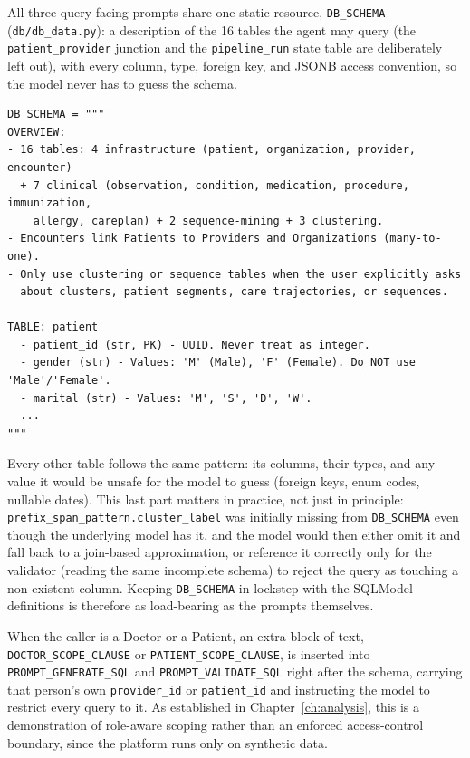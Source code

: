 All three query-facing prompts share one static resource, \texttt{DB\_SCHEMA} (\texttt{db/db\_data.py}): a description of the 16 tables the agent may query (the \texttt{patient\_provider} junction and the \texttt{pipeline\_run} state table are deliberately left out), with every column, type, foreign key, and JSONB access convention, so the model never has to guess the schema.

\vspace{0.25cm}

\begin{lstlisting}[style=pythonstyle]
DB_SCHEMA = """
OVERVIEW:
- 16 tables: 4 infrastructure (patient, organization, provider, encounter)
  + 7 clinical (observation, condition, medication, procedure, immunization,
    allergy, careplan) + 2 sequence-mining + 3 clustering.
- Encounters link Patients to Providers and Organizations (many-to-one).
- Only use clustering or sequence tables when the user explicitly asks
  about clusters, patient segments, care trajectories, or sequences.

TABLE: patient
  - patient_id (str, PK) - UUID. Never treat as integer.
  - gender (str) - Values: 'M' (Male), 'F' (Female). Do NOT use 'Male'/'Female'.
  - marital (str) - Values: 'M', 'S', 'D', 'W'.
  ...
"""
\end{lstlisting}

\noindent Every other table follows the same pattern: its columns, their types, and any value it would be unsafe for the model to guess (foreign keys, enum codes, nullable dates). This last part matters in practice, not just in principle: \texttt{prefix\_span\_pattern.cluster\_label} was initially missing from \texttt{DB\_SCHEMA} even though the underlying model has it, and the model would then either omit it and fall back to a join-based approximation, or reference it correctly only for the validator (reading the same incomplete schema) to reject the query as touching a non-existent column. Keeping \texttt{DB\_SCHEMA} in lockstep with the SQLModel definitions is therefore as load-bearing as the prompts themselves.

When the caller is a Doctor or a Patient, an extra block of text, \texttt{DOCTOR\_SCOPE\_CLAUSE} or \texttt{PATIENT\_SCOPE\_CLAUSE}, is inserted into \texttt{PROMPT\_GENERATE\_SQL} and \texttt{PROMPT\_VALIDATE\_SQL} right after the schema, carrying that person's own \texttt{provider\_id} or \texttt{patient\_id} and instructing the model to restrict every query to it. As established in Chapter~\ref{ch:analysis}, this is a demonstration of role-aware scoping rather than an enforced access-control boundary, since the platform runs only on synthetic data.
